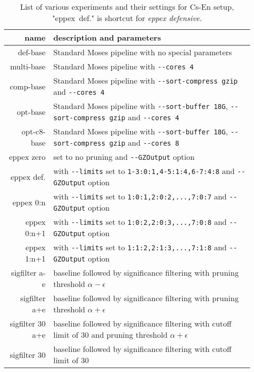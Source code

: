\begin{table}[ht]
\centering
\begin{tabular}{ r p{10cm} }
name & description and parameters \\
\hline
\hline
def-base        & Standard Moses pipeline with no special parameters \\
multi-base      & Standard Moses pipeline with \verb|--cores 4| \\
comp-base       & Standard Moses pipeline with \verb|--sort-compress gzip| and \verb|--cores 4| \\
opt-base        & Standard Moses pipeline with \verb|--sort-buffer 18G|, \verb|--sort-compress gzip| and \verb|--cores 4| \\
opt-c8-base     & Standard Moses pipeline with \verb|--sort-buffer 18G|, \verb|--sort-compress gzip| and \verb|--cores 8| \\
\hline
eppex zero      & \eppex{} set to no pruning and \verb|--GZOutput| option \\
eppex def.      & \eppex{} with \verb|--limits| set to \verb|1-3:0:1,4-5:1:4,6-7:4:8| and \verb|--GZOutput| option \\
eppex 0:n       & \eppex{} with \verb|--limits| set to \verb|1:0:1,2:0:2,...,7:0:7| and \verb|--GZOutput| option \\
eppex 0:n+1     & \eppex{} with \verb|--limits| set to \verb|1:0:2,2:0:3,...,7:0:8| and \verb|--GZOutput| option \\
eppex 1:n+1     & \eppex{} with \verb|--limits| set to \verb|1:1:2,2:1:3,...,7:1:8| and \verb|--GZOutput| option \\
\hline
sigfilter a-e   & baseline followed by significance filtering with pruning threshold $\alpha - \epsilon$ \\
sigfilter a+e   & baseline followed by significance filtering with pruning threshold $\alpha + \epsilon$ \\
sigfilter 30 a+e  & baseline followed by significance filtering with cutoff limit of 30 and pruning threshold $\alpha + \epsilon$ \\
sigfilter 30    & baseline followed by significance filtering with cutoff limit of 30 \\
\hline
\hline
\end{tabular}
\caption{\label{cs-en-wmt13-scenarios}
List of various experiments and their settings for Cs-En setup, "eppex~def." is shortcut for \emph{eppex defensive}.}
\end{table}

